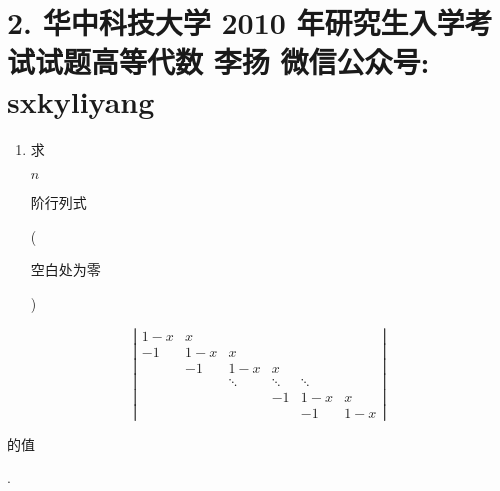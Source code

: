\documentclass[10pt]{article}
\begin{document}
\section{2. 华中科技大学 2010 年研究生入学考试试题高等代数 
 李扬 
 微信公众号: sxkyliyang}
\begin{enumerate}
  \item \begin{CJK}{UTF8}{mj}求\end{CJK} $n$ \begin{CJK}{UTF8}{mj}阶行列式\end{CJK} (\begin{CJK}{UTF8}{mj}空白处为零\end{CJK})
\end{enumerate}
$$
\left|\begin{array}{cccccc}
1-x & x & & & & \\
-1 & 1-x & x & & & \\
& -1 & 1-x & x & & \\
& & \ddots & \ddots & \ddots & \\
& & & -1 & 1-x & x \\
& & & & -1 & 1-x
\end{array}\right|
$$
\begin{CJK}{UTF8}{mj}的值\end{CJK}.
\end{document}
